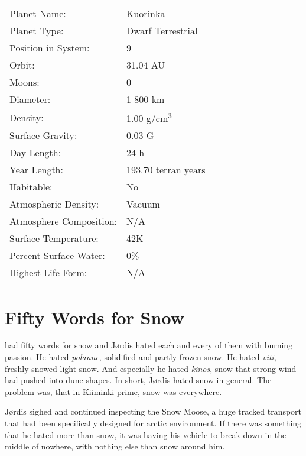 \documentclass{tufte-book}
\begin{document}
\bigskip
\begin{minipage}{\textwidth}
\begin{center}
\begin{tabular}{ll}
\toprule
Planet Name: & Kuorinka \\
Planet Type: & Dwarf Terrestrial \\
Position in System: & 9 \\
Orbit: & 31.04 AU \\
Moons: & 0 \\
Diameter: & 1 800 km \\
Density: & 1.00 g/cm\textsuperscript{3} \\
Surface Gravity: & 0.03 G \\
Day Length: & 24 h \\
Year Length: & 193.70 terran years \\
Habitable: & No \\
\quad Atmospheric Density: & Vacuum \\
\quad Atmosphere Composition: & N/A \\
\quad Surface Temperature: & 42K \\
\quad Percent Surface Water: & 0\% \\
\quad Highest Life Form: & N/A \\

\bottomrule
\end{tabular}
\end{center}
\end{minipage}



\chapter{Fifty Words for Snow}

 had fifty words for snow and
J\o rdis hated each and every of them with burning passion. He hated
\emph{polanne}, solidified and partly frozen snow. He hated \emph{viti}, 
freshly snowed light snow. And especially he hated \emph{kinos}, snow 
that strong wind had pushed into dune shapes. In short, J\o rdis hated 
snow in general. The problem was, that in Kiiminki prime, snow was 
everywhere.

J\o rdis sighed and continued inspecting the Snow Moose, a huge
tracked transport that had been specifically designed for arctic
environment. If there was something that he hated more than snow, it
was having his vehicle to break down in the middle of nowhere, with
nothing else than snow around him.
\end{document}
